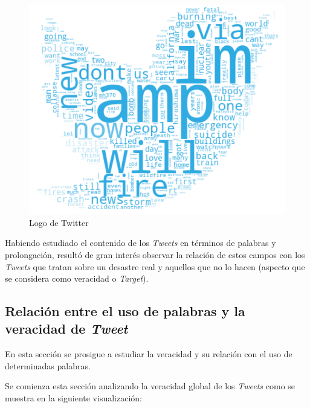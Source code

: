 \documentclass[titlepage,a4paper]{article}
\begin{document}
    \begin{figure}[H]
    \centering
    \includegraphics[width=1\textwidth]{graficos/Analisis Lexico Grafico/PalabrasMasUsadasConFiltro.png}
    \caption{Logo de Twitter}
    \end{figure}
    
    Habiendo estudiado el contenido de los \textit{Tweets} en términos de palabras y prolongación, resultó de gran interés observar la relación de estos campos con los \textit{Tweets} que tratan sobre un desastre real y aquellos que no lo hacen (aspecto que se considera como veracidad o \textit{Target}).
    
    \subsection{Relación entre el uso de palabras y la veracidad de \textit{Tweet}}
    En esta sección se prosigue a estudiar la veracidad y su relación con el uso de determinadas palabras. 
    
    Se comienza esta sección analizando la veracidad global de los \textit{Tweets} como se muestra en la siguiente visualización:
    
\end{document}
